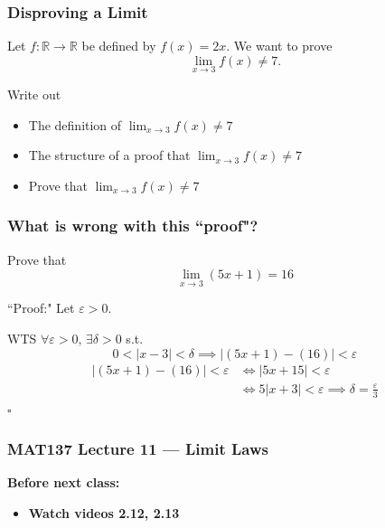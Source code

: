 \documentclass[14pt]{beamer}
\newcommand {\DS} [1] {${\displaystyle #1}$}
\newcommand{\e}{\varepsilon}
\newcommand{\p}{\pause}
\newcommand{\setsize}[1]{\fontsize{#1}{#1}\selectfont} %
\newcommand{\smallerfont}{\setsize{13}} %
\begin{document}
\begin{frame}
\frametitle{Disproving a Limit}

	Let $f:\mathbb R\to\mathbb R$ be defined by $f(x)=2x$. We want to prove
	\[
		\lim_{x\to 3} f(x)\neq 7.
	\]

	\vfill
	Write out
	\begin{itemize}
		\item The definition of \DS{\lim_{x\to 3}f(x)\neq 7}
		\item The structure of a proof that \DS{\lim_{x\to 3}f(x)\neq 7}
		\vfill\p
		\item Prove that \DS{\lim_{x\to 3}f(x)\neq 7}
	\end{itemize}

\end{frame}


\begin{frame}
\frametitle{What is wrong with this ``proof"?}
\smallerfont
\vspace{-2mm}
\begin{block}{}%
Prove that 
$$
\lim_{x\to 3} (5x+1) = 16
$$
\end{block}

\begin{block}{``Proof:"}
	Let $\e>0$.

	WTS $\forall \e>0$, $\exists\delta>0$ s.t. 
		$$  0<|x-3|<\delta \implies |(5x+1) - (16)|<\e$$
\vspace{-3mm}
	\begin{align*}
		|(5x+1) - (16)|<\varepsilon &\iff |5x+15|<\e \\
		&\iff 5|x+3|<\e \implies\delta=\frac{\e}{3}
	\end{align*}
\hfill $\square$
\end{block}

\end{frame}


\begin{frame}
\frametitle{MAT137 Lecture 11 --- Limit Laws}
	{\bf Before next class:}
		\begin{itemize} \normalsize
			\item {\bf Watch videos 2.12, 2.13 }
		\end{itemize}
	\vfill

\end{frame}
\end{document}
